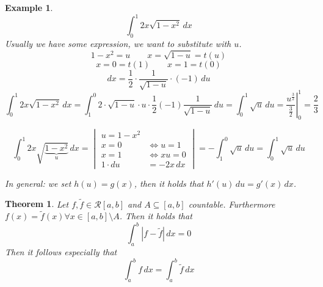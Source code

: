 \documentclass{article}
\newtheorem{theorem}{Theorem}  \numberwithin{theorem}{section}
\newtheorem{example}{Example}  \numberwithin{example}{section}
\newcommand{\card}[1]{\left|#1\right|}
\begin{document}
\begin{example}
  \[ \int_0^1 2x \sqrt{1 - x^2} \, dx \]
  Usually we have some expression, we want to substitute with $u$.
  \[ 1 - x^2 = u \qquad x = \sqrt{1 - u} = t(u) \]
  \[ x = 0 = t(1) \qquad x = 1 = t(0) \]
  \[ dx = \frac12 \cdot \frac{1}{\sqrt{1 - u}} \cdot (-1) \, du \]
  \[ \int_0^1 2x \sqrt{1 - x^2} \, dx = \int_1^0 2 \cdot \sqrt{1 - u} \cdot u \cdot \frac12 (-1) \frac{1}{\sqrt{1 - u}} \, du = \int_0^1 \sqrt{u} \, du = \left. \frac{u^{\frac32}}{\frac32} \right|_0^1 = \frac23 \]

  \[
    \int_0^1 2x \sqrt{\underbrace{1 - x^2}_{u}} \, dx =
    \begin{vmatrix}
      u = 1 - x^2 & \\
      x = 0 & \Leftrightarrow u = 1 \\
      x = 1 & \Leftrightarrow xu = 0 \\
      1 \cdot du &= -2x \, dx
    \end{vmatrix}
    = -\int_1^0 \sqrt{u} \, du = \int_0^1 \sqrt{u} \, du
  \]

  In general: we set $h(u) = g(x)$, then it holds that $h'(u) \, du = g'(x) \, dx$.
\end{example}

\begin{theorem} %
  Let $f, \tilde f \in \mathcal R[a,b]$ and $A \subseteq [a,b]$ countable.
  Furthermore $f(x) = \tilde f(x) \forall x \in [a,b] \setminus A$.
  Then it holds that
  \[ \int_a^b \card{f - \tilde f} \, dx = 0 \]
  Then it follows especially that
  \[ \int_a^b f \, dx = \int_a^b \tilde f \, dx \]
\end{theorem}
\end{document}
